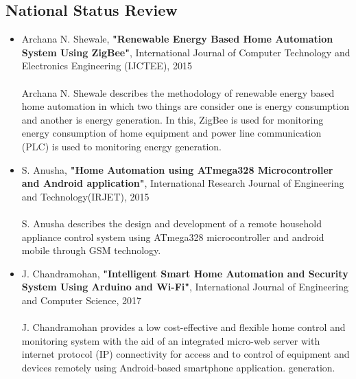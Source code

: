 \documentclass[12pt,a4paper,titlepage,twoside]{article}
\begin{document}
            \subsection{National Status Review}
            \begin{itemize}
                \item Archana N. Shewale, \textbf{"Renewable Energy Based Home Automation System Using ZigBee"}, International Journal of Computer Technology and Electronics Engineering (IJCTEE), 2015\\ \\
                Archana N. Shewale describes the methodology of renewable energy based home automation in which two things are consider one is energy consumption and another is energy generation. In this, ZigBee is used for monitoring energy consumption of home equipment and power line communication (PLC) is used to monitoring energy generation.
                \item S. Anusha, \textbf{"Home Automation using ATmega328 Microcontroller and Android application"}, International Research Journal of Engineering and Technology(IRJET), 2015\\ \\
                S. Anusha describes the design and development of a remote household appliance control system using ATmega328 microcontroller and android mobile through GSM technology.
                \item J. Chandramohan, \textbf{"Intelligent Smart Home Automation and Security System Using Arduino and Wi-Fi"}, International Journal of Engineering and Computer Science, 2017\\ \\
                J. Chandramohan provides a low cost-effective and flexible home control and monitoring system with the aid of an integrated micro-web server with internet protocol (IP) connectivity for access and to control of equipment and devices remotely using Android-based smartphone application. generation.
            \end{itemize}
\end{document}
